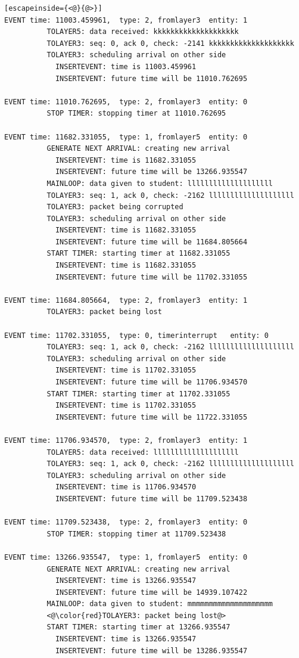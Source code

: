 \documentclass[paper=a4, fontsize=11pt]{scrartcl}
\numberwithin{equation}{section}		%
\numberwithin{figure}{section}			%
\numberwithin{table}{section}				%
\begin{document}
\begin{lstlisting}[escapeinside={<@}{@>}]
EVENT time: 11003.459961,  type: 2, fromlayer3  entity: 1
          TOLAYER5: data received: kkkkkkkkkkkkkkkkkkkk
          TOLAYER3: seq: 0, ack 0, check: -2141 kkkkkkkkkkkkkkkkkkkk
          TOLAYER3: scheduling arrival on other side
            INSERTEVENT: time is 11003.459961
            INSERTEVENT: future time will be 11010.762695

EVENT time: 11010.762695,  type: 2, fromlayer3  entity: 0
          STOP TIMER: stopping timer at 11010.762695

EVENT time: 11682.331055,  type: 1, fromlayer5  entity: 0
          GENERATE NEXT ARRIVAL: creating new arrival
            INSERTEVENT: time is 11682.331055
            INSERTEVENT: future time will be 13266.935547
          MAINLOOP: data given to student: llllllllllllllllllll
          TOLAYER3: seq: 1, ack 0, check: -2162 llllllllllllllllllll
          TOLAYER3: packet being corrupted
          TOLAYER3: scheduling arrival on other side
            INSERTEVENT: time is 11682.331055
            INSERTEVENT: future time will be 11684.805664
          START TIMER: starting timer at 11682.331055
            INSERTEVENT: time is 11682.331055
            INSERTEVENT: future time will be 11702.331055

EVENT time: 11684.805664,  type: 2, fromlayer3  entity: 1
          TOLAYER3: packet being lost

EVENT time: 11702.331055,  type: 0, timerinterrupt   entity: 0
          TOLAYER3: seq: 1, ack 0, check: -2162 llllllllllllllllllll
          TOLAYER3: scheduling arrival on other side
            INSERTEVENT: time is 11702.331055
            INSERTEVENT: future time will be 11706.934570
          START TIMER: starting timer at 11702.331055
            INSERTEVENT: time is 11702.331055
            INSERTEVENT: future time will be 11722.331055

EVENT time: 11706.934570,  type: 2, fromlayer3  entity: 1
          TOLAYER5: data received: llllllllllllllllllll
          TOLAYER3: seq: 1, ack 0, check: -2162 llllllllllllllllllll
          TOLAYER3: scheduling arrival on other side
            INSERTEVENT: time is 11706.934570
            INSERTEVENT: future time will be 11709.523438

EVENT time: 11709.523438,  type: 2, fromlayer3  entity: 0
          STOP TIMER: stopping timer at 11709.523438

EVENT time: 13266.935547,  type: 1, fromlayer5  entity: 0
          GENERATE NEXT ARRIVAL: creating new arrival
            INSERTEVENT: time is 13266.935547
            INSERTEVENT: future time will be 14939.107422
          MAINLOOP: data given to student: mmmmmmmmmmmmmmmmmmmm
          <@\color{red}TOLAYER3: packet being lost@>
          START TIMER: starting timer at 13266.935547
            INSERTEVENT: time is 13266.935547
            INSERTEVENT: future time will be 13286.935547


\end{lstlisting}
\end{document}
